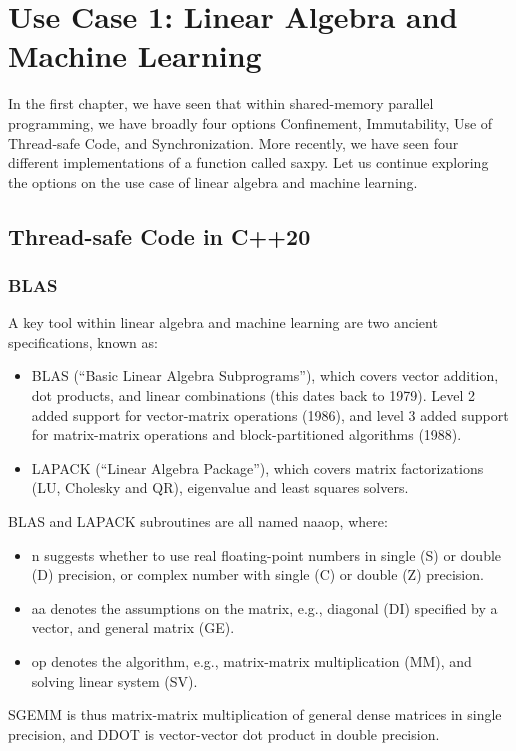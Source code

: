 \chapter{Use Case 1: Linear Algebra and Machine Learning}
\label{sec:lingebra}

In the first chapter, we have seen that within 
shared-memory parallel programming, we have broadly 
four options Confinement, Immutability, 
Use of Thread-safe Code, and Synchronization. 
More recently, we have seen four different  
implementations of a function called saxpy.
Let us continue exploring the options on the use 
case of linear algebra and machine learning. 

\section{Thread-safe Code in C++20}

\subsection{BLAS}

A key tool within linear algebra and machine learning are 
two ancient specifications, known as:
\begin{itemize} 
\item BLAS (``Basic Linear Algebra Subprograms''),
which covers vector addition, dot products, and linear combinations (this dates back to 1979).
 Level 2 added support for vector-matrix operations (1986),
 and level 3 added support for matrix-matrix operations and 
 block-partitioned algorithms (1988).
\item LAPACK (``Linear Algebra Package''), which 
covers matrix factorizations (LU, Cholesky and QR),
 eigenvalue and least squares solvers.
\end{itemize}

BLAS and LAPACK subroutines are all named naaop, where:
\begin{itemize} 
    \item n suggests whether to use real floating-point numbers in 
     single (S) or double (D) precision, 
     or complex number with single (C)
     or double (Z) precision.
    \item aa denotes the assumptions on the matrix, e.g., 
    diagonal (DI) specified by a vector, and 
    general matrix (GE).
    \item op denotes the algorithm, e.g., 
    matrix-matrix multiplication (MM), and 
    solving linear system (SV).
\end{itemize}
SGEMM is thus matrix-matrix multiplication of general dense matrices in single precision,
and DDOT is vector-vector dot product in double precision.

